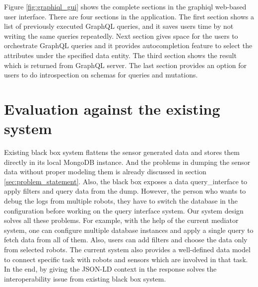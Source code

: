 \newpage
Figure \ref{fig:graphiql_gui} shows the complete sections in the graphiql web-based user interface. There are four sections in the application. The first section shows a list of previously executed GraphQL queries, and it saves users time by not writing the same queries repeatedly. Next section gives space for the users to orchestrate GraphQL queries and it provides autocompletion feature to select the attributes under the specified data entity. The third section shows the result which is returned from GraphQL server. The last section provides an option for users to do introspection on schemas for queries and mutations.

\section{Evaluation against the existing system}
Existing black box system flattens the sensor generated data and stores them directly in its local MongoDB instance. And the problems in dumping the sensor data without proper modeling them is already discussed in section \ref{sec:problem_statement}. Also, the black box exposes a data query\_interface to apply filters and query data from the dump. However, the person who wants to debug the logs from multiple robots, they have to switch the database in the configuration before working on the query interface system. Our system design solves all these problems. For example, with the help of the current mediator system, one can configure multiple database instances and apply a single query to fetch data from all of them. Also, users can add filters and choose the data only from selected robots. The current system also provides a well-defined data model to connect specific task with robots and sensors which are involved in that task. In the end, by giving the JSON-LD context in the response solves the interoperability issue from existing black box system.

